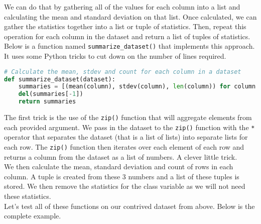 \documentclass[12pt]{article}
\begin{document}
We can do that by gathering all of the values for each column into a list and calculating the mean and standard deviation on that list. Once calculated, we can gather the statistics together into a list or tuple of statistics. Then, repeat this operation for each column in the dataset and return a list of tuples of statistics.\\

Below is a function named \verb|summarize_dataset()| that implements this approach. It uses some Python tricks to cut down on the number of lines required.

\begin{lstlisting}[language=python]
# Calculate the mean, stdev and count for each column in a dataset
def summarize_dataset(dataset):
	summaries = [(mean(column), stdev(column), len(column)) for column in zip(*dataset)]
	del(summaries[-1])
	return summaries

\end{lstlisting}

The first trick is the use of the \verb|zip()| function that will aggregate elements from each provided argument. We pass in the dataset to the \verb|zip()| function with the \verb|*| operator that separates the dataset (that is a list of lists) into separate lists for each row. The \verb|zip()| function then iterates over each element of each row and returns a column from the dataset as a list of numbers. A clever little trick.\\

We then calculate the mean, standard deviation and count of rows in each column. A tuple is created from these 3 numbers and a list of these tuples is stored. We then remove the statistics for the class variable as we will not need these statistics.\\

Let's test all of these functions on our contrived dataset from above. Below is the complete example.

\newpage
\end{document}
